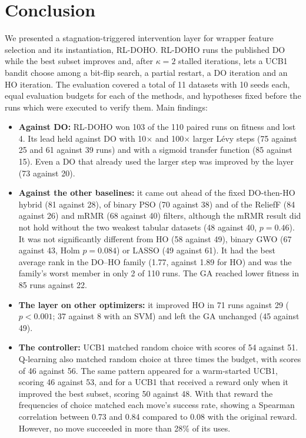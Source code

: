 \documentclass[pdflatex,sn-basic]{sn-jnl}
\begin{document}
\section{Conclusion}
We presented a stagnation-triggered intervention layer for wrapper feature selection and its instantiation, RL-DOHO. RL-DOHO runs the published DO while the best subset improves and, after $\kappa=2$ stalled iterations, lets a UCB1 bandit choose among a bit-flip search, a partial restart, a DO iteration and an HO iteration. The evaluation covered a total of 11 datasets with 10 seeds each, equal evaluation budgets for each of the methods, and hypotheses fixed before the runs which were executed to verify them. Main findings:
\begin{itemize}
\item \textbf{Against DO:} RL-DOHO won 103 of the 110 paired runs on fitness and lost 4. Its lead held against DO with 10$\times$ and 100$\times$ larger L\'evy steps (75 against 25 and 61 against 39 runs) and with a sigmoid transfer function (85 against 15). Even a DO that already used the larger step was improved by the layer (73 against 20).
\item \textbf{Against the other baselines:} it came out ahead of the fixed DO-then-HO hybrid (81 against 28), of binary PSO (70 against 38) and of the ReliefF (84 against 26) and mRMR (68 against 40) filters, although the mRMR result did not hold without the two weakest tabular datasets (48 against 40, $p=0.46$). It was not significantly different from HO (58 against 49), binary GWO (67 against 43, Holm $p=0.084$) or LASSO (49 against 61). It had the best average rank in the DO--HO family (1.77, against 1.89 for HO) and was the family's worst member in only 2 of 110 runs. The GA reached lower fitness in 85 runs against 22.
\item \textbf{The layer on other optimizers:} it improved HO in 71 runs against 29 ($p<0.001$; 37 against 8 with an SVM) and left the GA unchanged (45 against 49).
\item \textbf{The controller:} UCB1 matched random choice with scores of 54 against 51. Q-learning also matched random choice at three times the budget, with scores of 46 against 56. The same pattern appeared for a warm-started UCB1, scoring 46 against 53, and for a UCB1 that received a reward only when it improved the best subset, scoring 50 against 48. With that reward the frequencies of choice matched each move's success rate, showing a Spearman correlation between 0.73 and 0.84 compared to 0.08 with the original reward. However, no move succeeded in more than 28\% of its uses.

\end{itemize}
\end{document}

